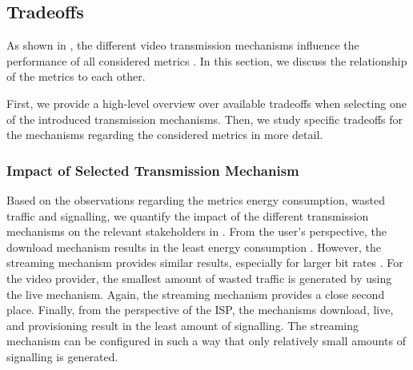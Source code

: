 \subsection{Tradeoffs}\label{sec:application:lte_video:trade_offs}
As shown in , the different video transmission mechanisms influence the performance of all considered metrics . 
In this section, we discuss the relationship of the metrics to each other.

First, we provide a high-level overview over available tradeoffs when selecting one of the introduced transmission mechanisms.
Then, we study specific tradeoffs for the \streaming mechanisms regarding the considered metrics in more detail.

\subsubsection*{Impact of Selected Transmission Mechanism}\label{sec:application:lte_video:trade_offs:mechanism_selection}

Based on the observations regarding the metrics energy consumption, wasted traffic and signalling, we quantify the impact of the different transmission mechanisms on the relevant stakeholders in .
From the user's perspective, the download mechanism results in the least energy consumption \energyconsumption.
However, the streaming mechanism provides similar results, especially for larger bit rates \bitrate.
For the video provider, the smallest amount of wasted traffic is generated by using the live mechanism.
Again, the streaming mechanism provides a close second place.
Finally, from the perspective of the \gls{ISP}, the mechanisms download, live, and provisioning result in the least amount of signalling.
The streaming mechanism can be configured in such a way that only relatively small amounts of signalling is generated.

